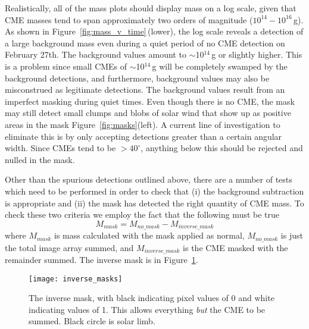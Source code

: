 Realistically, all of the mass plots should display mass on a log scale, given that CME masses tend to span approximately two orders of magnitude ($10^{14}-10^{16}$\,g). As shown in Figure~\ref{fig:mass_v_time}\,(lower), the log scale reveals a detection of a large background mass even during a quiet period of no CME detection on February 27th. The background values amount to $\sim$10$^{14}$\,g or slightly higher. This is a problem since small CMEs of $\sim$10$^{14}$\,g will be completely swamped by the background detections, and furthermore, background values may also be misconstrued as legitimate detections. The background values result from an imperfect masking during quiet times. Even though there is no CME, the mask may still detect small clumps and blobs of solar wind that show up as positive areas in the mask Figure~\ref{fig:masks}(left). A current line of investigation to eliminate this is by only accepting detections greater than a certain angular width. Since CMEs tend to be $>40^{\circ}$, anything below this should be rejected and nulled in the mask.
%
%

%
%
%
%

Other than the spurious detections outlined above, there are a number of tests which need to be performed in order to check that (i) the background subtraction is appropriate and (ii) the mask has detected the right quantity of CME mass. 
%
To check these two criteria we employ the fact that the following must be true
\begin{equation}
M_{mask} = M_{no\_mask} - M_{inverse\_mask}
\end{equation}
where $M_{mask}$ is mass calculated with the mask applied as normal, $M_{no\_mask}$ is just the total image array summed, and $M_{inverse\_mask}$ is the CME masked with the remainder summed. The inverse mask is in Figure~\ref{fig:inverse_masks}. 
\begin{figure}[t!]
\begin{center}
\texttt{[image: inverse\_masks]}
\caption[Inverse masks]{The inverse mask, with black indicating pixel values of 0 and white indicating values of 1. This allows everything \emph{but} the CME to be summed. Black circle is solar limb.}
\label{fig:inverse_masks}
\end{center}
\end{figure}

